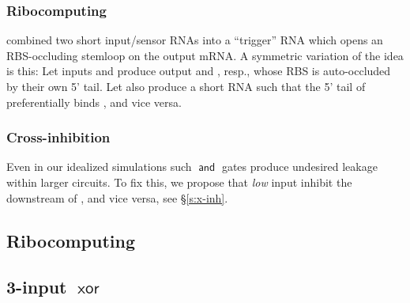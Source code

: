 \documentclass[12pt,notitlepage]{article}
\newcommand{\AND}{\ensuremath{\mathop{\mathsf{and}}}\xspace}
\newcommand{\XOR}{\ensuremath{\mathop{\mathsf{xor}}}\xspace}
\newcommand{\ra}[1]{{\color{Blue}#1}}
\begin{document}
\subsubsection*{Ribocomputing}

\cite[\href{https://www.nature.com/articles/nature23271/figures/2}{Fig.~2e}]{GreenETAL2017}
combined
two short input/sensor RNAs
into a ``trigger'' RNA
which opens an RBS-occluding stemloop
on the output mRNA.
%
%
A symmetric variation of the idea is this:
%
Let inputs  and  
produce
output  and , resp.,
whose RBS is auto-occluded
by their own 5' tail.
%
Let  
also produce a short RNA
such that
the 5' tail of  preferentially binds ,
and vice versa.

\subsubsection*{Cross-inhibition}

Even in our idealized simulations
such \AND gates produce undesired leakage
within larger circuits.
%
%
%
To fix this, we propose that
\emph{low} input  
{inhibit} the downstream of ,
and vice versa,
see \S\ref{s:x-inh}.




\subsection{Ribocomputing}

\ra{}


\subsection{3-input \texorpdfstring{\XOR}{XOR}}
\end{document}
